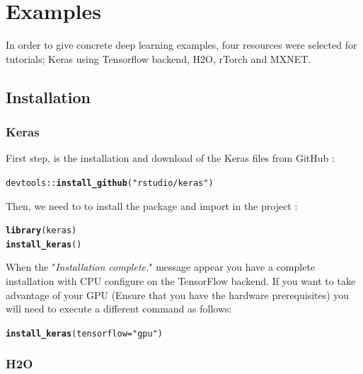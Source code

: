 \documentclass[6pt,letter]{article}\usepackage[]{graphicx}\usepackage[]{color}
\makeatletter
\newcommand{\hlstr}[1]{\textcolor[rgb]{0.192,0.494,0.8}{#1}}%
\newcommand{\hlopt}[1]{\textcolor[rgb]{0,0,0}{#1}}%
\newcommand{\hlstd}[1]{\textcolor[rgb]{0.345,0.345,0.345}{#1}}%
\newcommand{\hlkwc}[1]{\textcolor[rgb]{0.333,0.667,0.333}{#1}}%
\newcommand{\hlkwd}[1]{\textcolor[rgb]{0.737,0.353,0.396}{\textbf{#1}}}%
\newenvironment{kframe}{%
 \def\at@end@of@kframe{}%
 \ifinner\ifhmode%
  \def\at@end@of@kframe{\end{minipage}}%
  \begin{minipage}{\columnwidth}%
 \fi\fi%
 \def\FrameCommand##1{\hskip\@totalleftmargin \hskip-\fboxsep
 \colorbox{shadecolor}{##1}\hskip-\fboxsep
     \hskip-\linewidth \hskip-\@totalleftmargin \hskip\columnwidth}%
 \MakeFramed {\advance\hsize-\width
   \@totalleftmargin\z@ \linewidth\hsize
   \@setminipage}}%
 {\par\unskip\endMakeFramed%
 \at@end@of@kframe}
\newenvironment{knitrout}{}{} %
\makeatother
\begin{document}
\section{Examples}
\label{sec:examples}
In order to give concrete deep learning examples, four resources were selected for tutorials; Keras using Tensorflow backend, H2O, rTorch and MXNET.
\subsection{Installation}
\subsubsection{Keras}
First step, is the installation and download of the Keras files from GitHub :
\begin{knitrout}
\color{fgcolor}\begin{kframe}
\begin{alltt}
\hlstd{devtools}\hlopt{::}\hlkwd{install_github}\hlstd{(}\hlstr{"rstudio/keras"}\hlstd{)}
\end{alltt}
\end{kframe}
\end{knitrout}
Then, we need to to install the package and import in the project :
\begin{knitrout}
\color{fgcolor}\begin{kframe}
\begin{alltt}
\hlkwd{library}\hlstd{(keras)}
\hlkwd{install_keras}\hlstd{()}
\end{alltt}
\end{kframe}
\end{knitrout}
When the "\textit{Installation complete.}" message appear you have a complete installation with CPU configure on the TensorFlow backend.
If you want to take advantage of your GPU (Ensure that you have the hardware prerequisites) you will need to execute a different command as follows:
\begin{knitrout}
\color{fgcolor}\begin{kframe}
\begin{alltt}
\hlkwd{install_keras}\hlstd{(}\hlkwc{tensorflow} \hlstd{=} \hlstr{"gpu"}\hlstd{)}
\end{alltt}
\end{kframe}
\end{knitrout}
\subsubsection{H2O}
\end{document}
